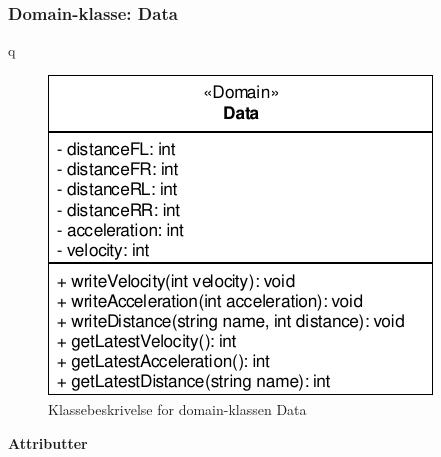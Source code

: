 \subsubsection{Domain-klasse: Data}
q
\begin{figure}[h]
\centering
\includegraphics[]{../fig/diagrammer/bil/cd_data.pdf}
\caption{Klassebeskrivelse for domain-klassen Data}
\label{fig:cd_data}
\end{figure}

\textbf{Attributter}

